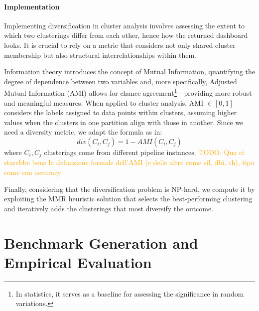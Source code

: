 \paragraph{Implementation}
Implementing diversification in cluster analysis involves assessing the extent to which two clusterings differ from each other, hence how the returned dashboard looks.
It is crucial to rely on a metric that considers not only shared cluster membership but also structural interrelationships within them.

Information theory introduces the concept of Mutual Information, quantifying the degree of dependence between two variables and, more specifically, Adjusted Mutual Information (AMI) allows for chance agreement\footnote{In statistics, it serves as a baseline for assessing the significance in random variations.}---providing more robust and meaningful measures.
When applied to cluster analysis, AMI $\in [0, 1]$ considers the labels assigned to data points within clusters, assuming higher values when the clusters in one partition align with those in another.
Since we need a diversity metric, we adapt the formula as in:
$$div(C_i, C_j) = 1- AMI(C_i, C_j)$$
where $C_i, C_j$ clusterings come from different pipeline instances.
\textcolor{orange}{TODO: Qua ci starebbe bene la definizione formale dell'AMI (e delle altre come sil, dbi, ch), tipo come con accuracy}

Finally, considering that the diversification problem is NP-hard, we compute it by exploiting the MMR heuristic solution \cite{vieira2011query} that selects the best-performing clustering and iteratively adds the clusterings that most diversify the outcome.

\section{Benchmark Generation and Empirical Evaluation}\label{clustering-sec:test}


